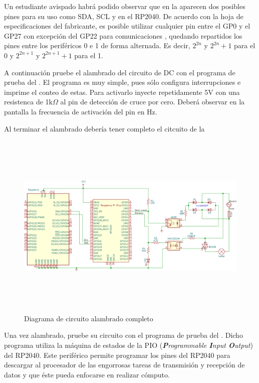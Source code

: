 Un estudiante avispado habrá podido observar que en la  aparecen dos posibles pines para su uso como SDA, SCL y \GND{} en el RP2040.
De acuerdo con la hoja de especificaciones del fabricante, es posible utilizar cualquier pin entre el GP0 y el GP27 con excepción del GP22 para comunicaciones \IIC,
quedando repartidos los pines entre los periféricos \IIC{}0 e \IIC{}1 de forma alternada.
Es decir, \(2^{2n}\) y \(2^{2n}+1\) para el \IIC{}0
y
\(2^{2n+1}\) y \(2^{2n+1}+1\) para el \IIC{}1.


\medskip

A continuación pruebe el alambrado del circuito de DC con el programa de prueba del .
El programa es muy simple, pues sólo configura interrupciones e imprime el conteo de estas.
Para activarlo inyecte repetidamente 5V con una resistenca de 1k$\Omega$ al pin de detección de cruce por cero.
Deberá observar en la pantalla la frecuencia de activación del pin en Hz.

Al terminar el alambrado debería tener completo el citcuito de la 
\begin{figure}[H]
	\centering
	\includegraphics[width=0.75\columnwidth,height=9cm,keepaspectratio]{img/circuit-full.png}
	\caption{Diagrama de circuito alambrado completo}%
	\label{fig:circuit-full}
\end{figure}

Una vez alambrado, pruebe su circuito con el programa de prueba del .
Dicho programa utiliza la máquina de estados de la PIO (\emph{\textbf{P}rogrammable \textbf{I}nput \textbf{O}utput}) del RP2040.
Este periférico permite programar los pines del RP2040 para descargar al procesador de las engorrosas tareas de transmisión y recepción de datos y que éste pueda enfocarse en realizar cómputo.

